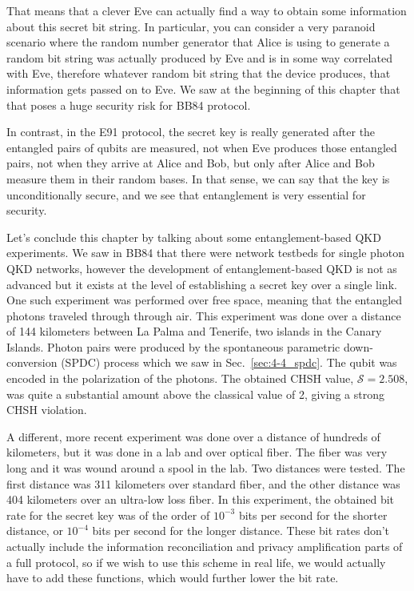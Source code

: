 That means that a clever Eve can actually find a way to obtain some information about this secret bit string. In particular, you can consider a very paranoid scenario where the random number generator that Alice is using to generate a random bit string was actually produced by Eve and is in some way correlated with Eve, therefore whatever random bit string that the device produces, that information gets passed on to Eve. We saw at the beginning of this chapter that that poses a huge security risk for BB84 protocol.

In contrast, in the E91 protocol, the secret key is really generated after the entangled pairs of qubits are measured, not when Eve produces those entangled pairs, not when they arrive at Alice and Bob, but only after Alice and Bob measure them in their random bases. In that sense, we can say that the key is unconditionally secure, and we see that entanglement is very essential for security.

Let's conclude this chapter by talking about some entanglement-based QKD experiments. We saw in BB84 that there were network testbeds for single photon QKD networks, however the development of entanglement-based QKD is not as advanced but it exists at the level of establishing a secret key over a single link. One such experiment was performed over free space, meaning that the entangled photons traveled through through air.  This experiment was done over a distance of 144 kilometers between La Palma and Tenerife, two islands in the Canary Islands. Photon pairs were produced by the spontaneous parametric down-conversion (SPDC) process which we saw in Sec.~\ref{sec:4-4_spdc}. The qubit was encoded in the polarization of the photons. The obtained CHSH value, $\mathcal{S} =2.508$, was quite a substantial amount above the classical value of 2, giving a strong CHSH violation.

A different, more recent experiment was done over a distance of hundreds of kilometers, but it was done in a lab and over optical fiber. The fiber was very long and it was wound around a spool in the lab.  Two distances were tested. The  first distance was 311 kilometers over standard fiber, and the other distance was 404 kilometers over an ultra-low loss fiber.  In this experiment, the obtained bit rate for the secret key was of the order of $10^{-3}$ bits per second for the shorter distance, or $10^{-4}$ bits per second for the longer distance. These bit rates don't actually include the information reconciliation and privacy amplification parts of a full protocol, so if we wish to use this scheme in real life, we would actually have to add these functions, which would further lower the bit rate.

